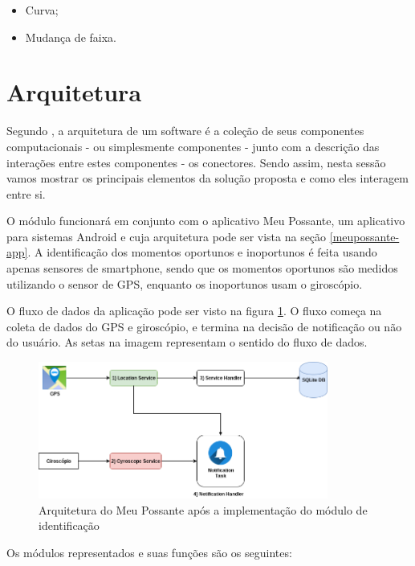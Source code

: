 \begin{itemize}
  \item Curva;
  \item Mudança de faixa.
\end{itemize}

\section{Arquitetura}
\label{sec-arquitetura-solucao}
Segundo , a arquitetura de um software é a coleção de seus componentes computacionais - ou simplesmente
componentes - junto com a descrição das interações entre estes componentes - os conectores.  Sendo assim, nesta sessão
vamos mostrar os principais elementos da solução proposta e como eles interagem entre si.

O módulo funcionará em conjunto com o aplicativo Meu Possante, um aplicativo para sistemas Android e cuja arquitetura pode ser vista
na seção \ref{meupossante-app}. A identificação dos momentos oportunos e inoportunos é feita usando apenas sensores de smartphone,
sendo que os momentos oportunos são medidos utilizando o sensor de GPS, enquanto os inoportunos usam o giroscópio.

O fluxo de dados da aplicação pode ser visto na figura \ref{arquitetura-meu-possante-com-modulo}. O fluxo começa
na coleta de dados do GPS e giroscópio, e termina na decisão de notificação ou não do usuário. As setas na
imagem representam o sentido do fluxo de dados.

\begin{figure}[h]
\centering
\includegraphics[width=0.85\textwidth]{images/arquitetura-meu-possante-com-modulo.png}
\caption{Arquitetura do Meu Possante após a implementação do módulo de identificação}
\label{arquitetura-meu-possante-com-modulo}
\end{figure}

Os módulos representados e suas funções são os seguintes:

